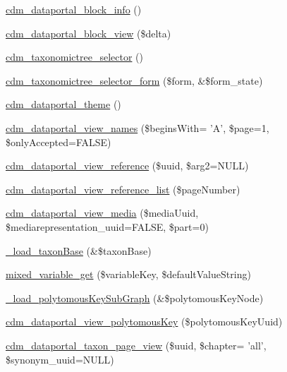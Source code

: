 \begin{DoxyCompactItemize}
\item 
\hyperlink{cdm__dataportal_8module_a739349bf01b07311eb2c600f01ef930d}{cdm\-\_\-dataportal\-\_\-block\-\_\-info} ()
\item 
\hyperlink{cdm__dataportal_8module_a98034ba12df2c398b4161568821f8190}{cdm\-\_\-dataportal\-\_\-block\-\_\-view} (\$delta)
\item 
\hyperlink{cdm__dataportal_8module_acb6317cb72e1fa606de589882314ce65}{cdm\-\_\-taxonomictree\-\_\-selector} ()
\item 
\hyperlink{cdm__dataportal_8module_a280c49c34306f0ad6891928c7a3247d3}{cdm\-\_\-taxonomictree\-\_\-selector\-\_\-form} (\$form, \&\$form\-\_\-state)
\item 
\hyperlink{cdm__dataportal_8module_a097c5d808d5b4e7994780c14ddde4a32}{cdm\-\_\-dataportal\-\_\-theme} ()
\item 
\hyperlink{cdm__dataportal_8module_af5237dfb1511aae111fa31b92f416bc4}{cdm\-\_\-dataportal\-\_\-view\-\_\-names} (\$begins\-With= 'A', \$page=1, \$only\-Accepted=F\-A\-L\-S\-E)
\item 
\hyperlink{cdm__dataportal_8module_ae5b312320ce2dcdf7a16e9551f6b8a4c}{cdm\-\_\-dataportal\-\_\-view\-\_\-reference} (\$uuid, \$arg2=N\-U\-L\-L)
\item 
\hyperlink{cdm__dataportal_8module_a195d7bd48f4b92c1cacefeef1b51fbf9}{cdm\-\_\-dataportal\-\_\-view\-\_\-reference\-\_\-list} (\$page\-Number)
\item 
\hyperlink{cdm__dataportal_8module_a5fccbb57383b06fac2b13bdc1ef5f8cf}{cdm\-\_\-dataportal\-\_\-view\-\_\-media} (\$media\-Uuid, \$mediarepresentation\-\_\-uuid=F\-A\-L\-S\-E, \$part=0)
\item 
\hyperlink{cdm__dataportal_8module_a46857eb60a0c886297b6c657dff67041}{\-\_\-load\-\_\-taxon\-Base} (\&\$taxon\-Base)
\item 
\hyperlink{cdm__dataportal_8module_ac934dac034a2bf8c38229ac6e0ffcc26}{mixed\-\_\-variable\-\_\-get} (\$variable\-Key, \$default\-Value\-String)
\item 
\hyperlink{cdm__dataportal_8module_ad11c212ec1ca071fd67c7eeabaed05e5}{\-\_\-load\-\_\-polytomous\-Key\-Sub\-Graph} (\&\$polytomous\-Key\-Node)
\item 
\hyperlink{cdm__dataportal_8module_ab581b1a3f96ee53c461ea781eb7c3992}{cdm\-\_\-dataportal\-\_\-view\-\_\-polytomous\-Key} (\$polytomous\-Key\-Uuid)
\item 
\hyperlink{cdm__dataportal_8module_af5843f9a5ea8d033241be759296f687f}{cdm\-\_\-dataportal\-\_\-taxon\-\_\-page\-\_\-view} (\$uuid, \$chapter= 'all', \$synonym\-\_\-uuid=N\-U\-L\-L)

\end{DoxyCompactItemize}
